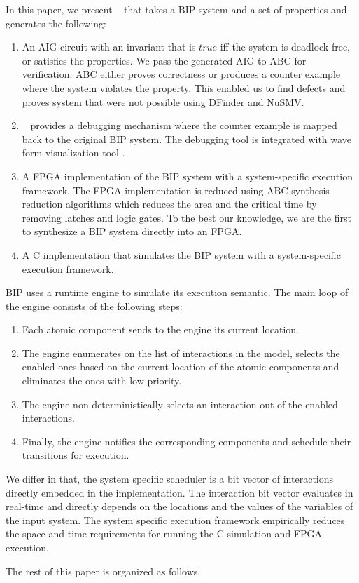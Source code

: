 In this paper, we present \biptool~ that takes a BIP system and a set of properties and generates the following:

\begin{enumerate}
\item An AIG circuit with an invariant that is $\mathit{true}$ iff the system is deadlock free, or satisfies the properties. We pass the generated AIG to ABC for verification. ABC either proves correctness or produces a counter example where the system violates the property. This enabled us to find defects and proves system that were not possible using DFinder and NuSMV. 
\item  \biptool~ provides a debugging mechanism where the counter example is mapped back to the original BIP system. The debugging tool is integrated with wave form visualization tool \cite{bybell2010gtkwave}.  
\item A FPGA implementation of the BIP system with a system-specific execution framework. The FPGA implementation is reduced using ABC synthesis reduction algorithms which reduces the area and the critical time by removing latches and logic gates. To the best our knowledge, we are the first to synthesize a BIP system directly into an FPGA. 
\item A C implementation that simulates the BIP system with a system-specific execution framework. 
\end{enumerate}


BIP uses a runtime engine to simulate its execution semantic. The main loop of the engine consists of the following steps:
\begin{enumerate}
\item Each atomic component sends to the engine its current location.
\item The engine enumerates on the list of interactions in the model, selects the enabled ones based on the current location of the atomic components and eliminates the ones with low priority.
\item The engine non-deterministically selects an interaction out of the enabled interactions.
\item Finally, the engine notifies the corresponding components and schedule their transitions for execution. 
\end{enumerate}
We differ in that, the system specific scheduler is a bit vector of interactions directly embedded in the implementation. The interaction bit vector evaluates in real-time 
and directly depends on the locations and the values of the variables of the input system. The system specific execution framework empirically reduces the space and time requirements for running the C simulation and FPGA execution. 


The rest of this paper is organized as follows.
